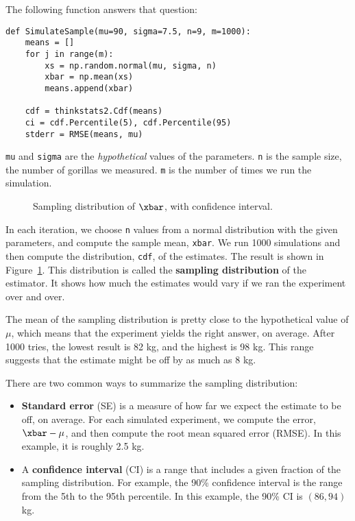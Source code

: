 The following function answers that question:

\begin{verbatim}
def SimulateSample(mu=90, sigma=7.5, n=9, m=1000):
    means = []
    for j in range(m):
        xs = np.random.normal(mu, sigma, n)
        xbar = np.mean(xs)
        means.append(xbar)

    cdf = thinkstats2.Cdf(means)
    ci = cdf.Percentile(5), cdf.Percentile(95)
    stderr = RMSE(means, mu)
\end{verbatim}

{\tt mu} and {\tt sigma} are the {\em hypothetical} values of
the parameters.  {\tt n} is the sample size, the number of
gorillas we measured.  {\tt m} is the number of times we run
the simulation.

\begin{figure}
\caption{Sampling distribution of $\xbar$, with confidence interval.}
\label{estimation1}
\end{figure}

In each iteration, we choose {\tt n} values from a normal
distribution with the given parameters, and compute the sample mean,
{\tt xbar}.  We run 1000 simulations and then compute the
distribution, {\tt cdf}, of the estimates.  The result is shown in
Figure~\ref{estimation1}.  This distribution is called the {\bf
  sampling distribution} of the estimator.  It shows how much the
estimates would vary if we ran the experiment over and over.

The mean of the sampling distribution is pretty close
to the hypothetical value of $\mu$, which means that the experiment
yields the right answer, on average.  After 1000 tries, the lowest
result is 82 kg, and the highest is 98 kg.  This range suggests that
the estimate might be off by as much as 8 kg.

There are two common ways to summarize the sampling distribution:

\begin{itemize}

\item {\bf Standard error} (SE) is a measure of how far we expect the
  estimate to be off, on average.  For each simulated experiment, we
  compute the error, $\xbar - \mu$, and then compute the root mean
  squared error (RMSE).  In this example, it is roughly 2.5 kg.

\item A {\bf confidence interval} (CI) is a range that includes a
  given fraction of the sampling distribution.  For example, the 90\%
  confidence interval is the range from the 5th to the 95th
  percentile.  In this example, the 90\% CI is $(86, 94)$ kg.

\end{itemize}

